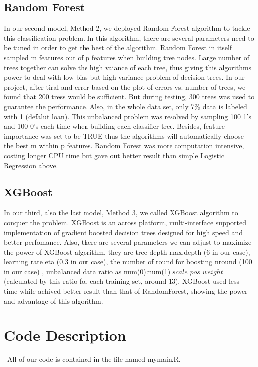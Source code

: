 \documentclass[12pt]{article}
\begin{document}
\subsection{Random Forest}
\quad In our second model, Method 2, we deployed Random Forest algorithm to tackle this classification problem. In this algorithm, there are several parameters need to be tuned in order to get the best of the algorithm. Random Forest in itself sampled m features out of p features when building tree nodes. Large number of trees together can solve the high vaiance of each tree, thus giving this algorithms power to deal with low bias but high variance problem of decision trees. In our project, after tiral and error based on the plot of errors vs. number of trees, we found that 200 tress would be sufficient. But during testing, 300 trees was used to guarantee the performance. Also, in the whole data set, only 7\% data is labeled with 1 (defalut loan). This unbalanced problem was resolved by sampling 100 1's and 100 0's each time when building each classifier tree. Besides, feature importance was set to be TRUE thus the algorithms will automatically choose the best m within p features. Random Forest was more computation intensive, costing longer CPU time but  gave out better result than simple Logistic Regression above.

\subsection{XGBoost}
\quad In our third, also the last model, Method 3, we called XGBoost algorithm to conquer the problem. XGBoost is an across platform, multi-interface supported implementation of gradient boosted decision trees designed for high speed and better perfomance. Also, there are several parameters we can adjust to maximize the power of XGBoost algorithm, they are tree depth max.depth (6 in our case), learning rate eta (0.3 in our case), the number of round for boosting nround (100 in our case) , unbalanced data ratio as num(0):num(1) $ scale\_pos\_weight $ (calculated by this ratio for each training set, around 13). XGBoost used less time while achived better result than that of RandomForest, showing the power and advantage of this algorithm.


\section{Code Description}
\quad\ All of our code is contained in the file named mymain.R. 
\end{document}
